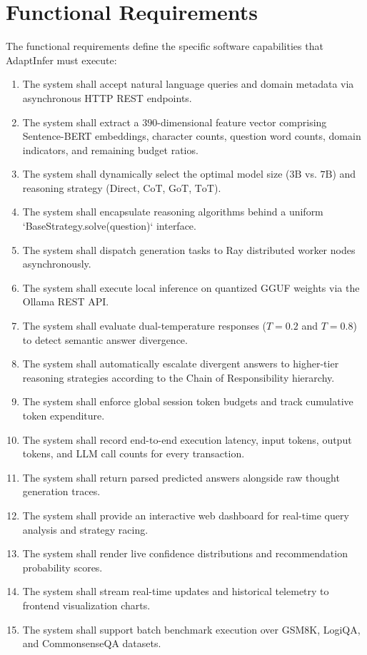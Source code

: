 \documentclass[12pt,a4paper]{report}
\begin{document}
\section{Functional Requirements}
\label{sec:functional_requirements}
The functional requirements define the specific software capabilities that AdaptInfer must execute:
\begin{enumerate}[leftmargin=*]
    \item The system shall accept natural language queries and domain metadata via asynchronous HTTP REST endpoints.
    \item The system shall extract a $390$-dimensional feature vector comprising Sentence-BERT embeddings, character counts, question word counts, domain indicators, and remaining budget ratios.
    \item The system shall dynamically select the optimal model size ($3\text{B}$ vs. $7\text{B}$) and reasoning strategy ($\text{Direct}$, $\text{CoT}$, $\text{GoT}$, $\text{ToT}$).
    \item The system shall encapsulate reasoning algorithms behind a uniform `BaseStrategy.solve(question)` interface.
    \item The system shall dispatch generation tasks to Ray distributed worker nodes asynchronously.
    \item The system shall execute local inference on quantized GGUF weights via the Ollama REST API.
    \item The system shall evaluate dual-temperature responses ($T=0.2$ and $T=0.8$) to detect semantic answer divergence.
    \item The system shall automatically escalate divergent answers to higher-tier reasoning strategies according to the Chain of Responsibility hierarchy.
    \item The system shall enforce global session token budgets and track cumulative token expenditure.
    \item The system shall record end-to-end execution latency, input tokens, output tokens, and LLM call counts for every transaction.
    \item The system shall return parsed predicted answers alongside raw thought generation traces.
    \item The system shall provide an interactive web dashboard for real-time query analysis and strategy racing.
    \item The system shall render live confidence distributions and recommendation probability scores.
    \item The system shall stream real-time updates and historical telemetry to frontend visualization charts.
    \item The system shall support batch benchmark execution over GSM8K, LogiQA, and CommonsenseQA datasets.
\end{enumerate}
\end{document}
